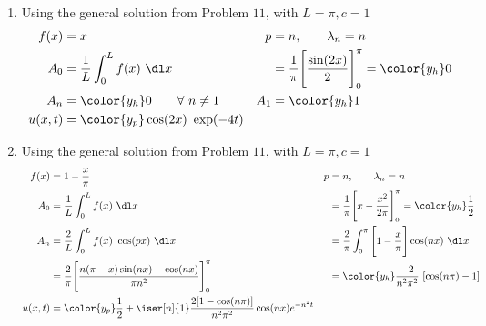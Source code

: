 \begin{enumerate}
    \item Using the general solution from Problem $ 11 $, with $ L = \pi, c = 1 $
          \begin{align}
              f(x)    & = x                                                    &
              p       & = n,\qquad \lambda_n = n                                 \\
              A_0     & = \frac{1}{L} \int_{0}^{L} f(x)\ \dl x                 &
                      & = \frac{1}{\pi} \Bigg[ \frac{\sin(2x)}{2} \Bigg]_0^\pi
              = \color{y_h} 0                                                    \\
              A_n     & = \color{y_h} 0 \qquad \forall\ n \neq 1               &
              A_1     & = \color{y_h} 1                                          \\
              u(x, t) & = \color{y_p} \cos(2x)\ \exp(-4t)
          \end{align}

    \item Using the general solution from Problem $ 11 $, with $ L = \pi, c = 1 $
          \begin{align}
              f(x)         & = 1 - \frac{x}{\pi}                                    &
              p            & = n,\qquad \lambda_n = n                                 \\
              A_0          & = \frac{1}{L} \int_{0}^{L} f(x)\ \dl x                 &
                           & = \frac{1}{\pi} \Bigg[ x - \frac{x^2}{2\pi}
                  \Bigg]_0^\pi
              = \color{y_h} \frac{1}{2}                                               \\
              A_n          & = \frac{2}{L} \int_{0}^{L} f(x)\ \cos(px)\ \dl x       &
                           & = \frac{2}{\pi} \int_{0}^{\pi} \Bigg[1 - \frac{x}{\pi}
                  \Bigg]
              \cos(n x)\ \dl x                                                        \\
                           & = \frac{2}{\pi} \Bigg[ \frac{n(\pi - x)\sin(nx)
                      - \cos(nx)}{\pi n^2}
              \Bigg]_0^\pi &
                           & = \color{y_h} \frac{-2}{n^2 \pi^2}\ [\cos(n\pi) - 1]     \\
              u(x, t)      & = \color{y_p} \frac{1}{2} + \iser[n]{1}
              \frac{2[1 - \cos(n\pi)]}{n^2 \pi^2} \cos(nx) e^{-n^2t}
          \end{align}


\end{enumerate}
